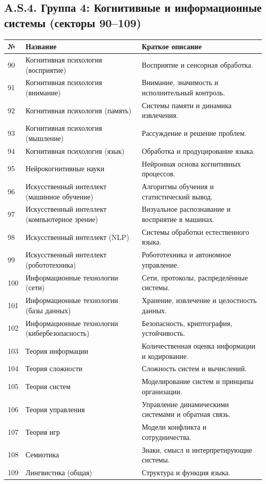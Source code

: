 \documentclass[11pt,a4paper]{article}
\begin{document}
	\subsection*{A.S.4. Группа 4: Когнитивные и информационные системы (секторы 90--109)}
	
	\begin{longtable}{|p{0.9cm}|p{6.0cm}|p{8.6cm}|}
		\hline
		\textbf{№} & \textbf{Название} & \textbf{Краткое описание} \\
		\hline
		\endhead
		90 & Когнитивная психология (восприятие) & Восприятие и сенсорная обработка. \\
		91 & Когнитивная психология (внимание) & Внимание, значимость и исполнительный контроль. \\
		92 & Когнитивная психология (память) & Системы памяти и динамика извлечения. \\
		93 & Когнитивная психология (мышление) & Рассуждение и решение проблем. \\
		94 & Когнитивная психология (язык) & Обработка и продуцирование языка. \\
		95 & Нейрокогнитивные науки & Нейронная основа когнитивных процессов. \\
		96 & Искусственный интеллект (машинное обучение) & Алгоритмы обучения и статистический вывод. \\
		97 & Искусственный интеллект (компьютерное зрение) & Визуальное распознавание и восприятие в машинах. \\
		98 & Искусственный интеллект (NLP) & Системы обработки естественного языка. \\
		99 & Искусственный интеллект (робототехника) & Робототехника и автономное управление. \\
		100 & Информационные технологии (сети) & Сети, протоколы, распределённые системы. \\
		101 & Информационные технологии (базы данных) & Хранение, извлечение и целостность данных. \\
		102 & Информационные технологии (кибербезопасность) & Безопасность, криптография, устойчивость. \\
		103 & Теория информации & Количественная оценка информации и кодирование. \\
		104 & Теория сложности & Сложность систем и вычислений. \\
		105 & Теория систем & Моделирование систем и принципы организации. \\
		106 & Теория управления & Управление динамическими системами и обратная связь. \\
		107 & Теория игр & Модели конфликта и сотрудничества. \\
		108 & Семиотика & Знаки, смысл и интерпретирующие системы. \\
		109 & Лингвистика (общая) & Структура и функция языка. \\
	\end{longtable}
	
\end{document}
